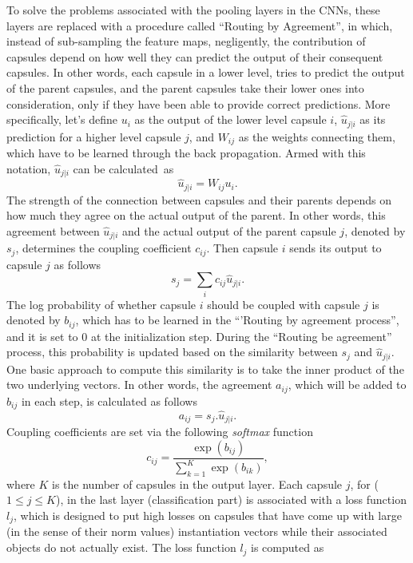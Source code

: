 \documentclass{article}
\begin{document}
To solve the problems associated with the pooling layers in the CNNs, these layers are replaced with a procedure called ``Routing by Agreement'', in which, instead of sub-sampling the feature maps, negligently, the contribution of capsules depend on how well they can predict the output of their consequent capsules. In other words, each capsule in a lower level, tries to predict the output of the parent capsules, and the parent capsules take their lower ones into consideration, only if they have been able to provide correct predictions. More specifically, let's define ${u_{i}}$ as the output of the lower level capsule $i$, $\hat{u}_{j|i}$ as its prediction for a higher level capsule $j$, and $W_{ij}$ as the weights connecting them, which have to be learned through the back propagation. Armed with this notation, $\hat{u}_{j|i}$ can be calculated~as
\begin{equation}
\hat{u}_{j|i}=W_{ij}u_i.
\end{equation}
The strength of the connection between capsules and their parents depends on how much they agree on the actual output of the parent. In other words, this agreement between $\hat{u}_{j|i}$ and the actual output of the parent capsule $j$, denoted by $s_j$, determines the coupling coefficient $c_{ij}$. Then capsule $i$ sends its output to capsule $j$ as follows
\begin{equation}
s_j=\sum_ic_{ij}\hat{u}_{j|i}.
\end{equation}
The log probability of whether capsule $i$ should be coupled with capsule $j$ is denoted by $b_{ij}$, which has to be learned in the ``'Routing by agreement process'', and it is set to $0$ at the initialization step. During the ``Routing be agreement'' process, this probability is updated based on the similarity between $s_j$ and $\hat{u}_{j|i}$. One basic approach to compute this similarity is to take the inner product of the two underlying vectors. In other words, the agreement $a_{ij}$, which will be added to $b_{ij}$ in each step, is calculated as follows
\begin{equation}
a_{ij}=s_j.\hat{u}_{j|i}.
\end{equation}
Coupling coefficients are set via the following \textit{softmax} function
\begin{equation}
c_{ij}=\frac{\exp(b_{ij})}{\sum_{k=1}^{K} \exp(b_{ik})},
\end{equation}
where $K$ is the number of capsules in the output layer. Each capsule $j$, for ($1 \leq j \leq K$), in the last layer (classification part) is associated with a loss function $l_j$, which is designed to put high losses on capsules that have come up with large (in the sense of their norm values) instantiation vectors while their associated objects do not actually exist. The  loss function $l_j$ is computed as
\end{document}
